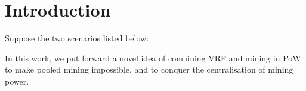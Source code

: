 \section{Introduction}





Suppose the two scenarios listed below:






In this work, we put forward a novel idea of combining VRF and mining in PoW to make pooled mining impossible, and to conquer the centralisation of mining power.